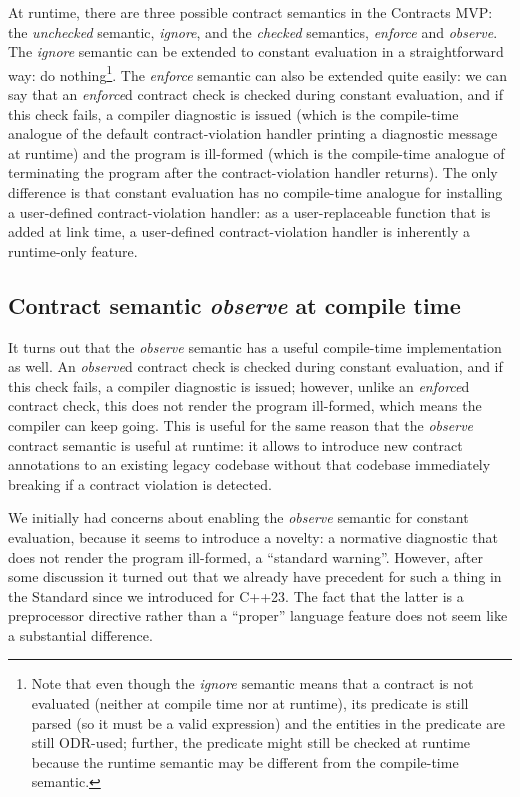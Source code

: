 At runtime, there are three possible contract semantics in the Contracts MVP: the \emph{unchecked} semantic, \emph{ignore}, and the \emph{checked} semantics, \emph{enforce} and \emph{observe}. The \emph{ignore} semantic can be extended to constant evaluation in a straightforward way: do nothing\footnote{Note that even though the \emph{ignore} semantic means that a contract is not evaluated (neither at compile time nor at runtime), its predicate is still parsed (so it must be a valid expression) and the entities in the predicate are still ODR-used; further, the predicate might still be checked at runtime because the runtime semantic may be different from the compile-time semantic.}. The \emph{enforce} semantic can also be extended quite easily:  we can say that an \emph{enforce}d contract check is checked during constant evaluation, and if this check fails, a compiler diagnostic is issued (which is the compile-time analogue of the default contract-violation handler printing a diagnostic message at runtime) and the program is ill-formed (which is the compile-time analogue of terminating the program after the contract-violation handler returns). The only difference is that constant evaluation has no compile-time analogue for installing a user-defined contract-violation handler: as a user-replaceable function that is added at link time, a user-defined contract-violation handler is inherently a runtime-only feature.

\subsection{Contract semantic \emph{observe} at compile time}

It turns out that the \emph{observe} semantic has a useful compile-time implementation as well. An \emph{observe}d contract check is checked during constant evaluation, and if this check fails, a compiler diagnostic is issued; however, unlike an \emph{enforce}d contract check, this does not render the program ill-formed, which means the compiler can keep going. This is useful for the same reason that the \emph{observe} contract semantic is useful at runtime: it allows to introduce new contract annotations to an existing legacy codebase without that codebase immediately breaking if a contract violation is detected.

We initially had concerns about enabling the \emph{observe} semantic for constant evaluation, because it seems to introduce a novelty: a normative diagnostic that does not render the program ill-formed, a ``standard warning''. However, after some discussion it turned out that we already have precedent for such a thing in the Standard since we introduced  \cite{P2437R1} for C++23. The fact that the latter is a preprocessor directive rather than a ``proper'' language feature does not seem like a substantial difference.

